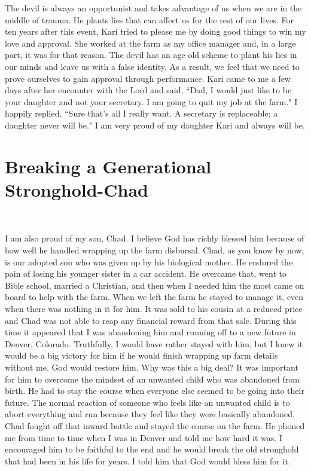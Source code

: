 \documentclass[oneside]{book}
\begin{document}
The devil is always an opportunist and takes advantage of us when we are in the middle of trauma. He plants lies that can affect us for the rest of our lives. For ten years after this event,  Kari tried to please me by doing good things to win my love and approval. She worked at the farm as my office manager and, in a large part, it was for that reason. The devil has an age old scheme to plant his lies in our minds and leave us with a false identity. As a result, we feel that we need to prove ourselves to gain approval through performance. Kari came to me a few days after her encounter with the Lord and said, ``Dad, I would just like to be your daughter and not your secretary. I am going to quit my job at the farm." I happily replied, ``Sure that's all I really want. A secretary is replaceable; a daughter never will be." I am  very proud of my daughter Kari and always will be. 


\section{Breaking a Generational Stronghold-Chad}
\

I am also proud of my son, Chad. I believe God has richly blessed him because of how well he handled wrapping up the farm disbursal. Chad, as you know by now, is our adopted son who was given up by his biological mother. He endured the pain of losing his younger sister in a car accident. He overcame that, went to Bible school, married a Christian, and then when I needed him the most came on board to help with the farm. When we left the farm he stayed to manage it, even when there was nothing in it for him. It was sold to his cousin at a reduced price and Chad was not able to reap any financial reward from that sale. During this time it appeared that I was abandoning him and running off to a new future in Denver, Colorado. Truthfully, I would have rather stayed with him, but I knew it would be a big victory for him if he would finish wrapping up farm details without me. God would restore him. Why was this a big deal? It was important for him to overcome the mindset of an unwanted child who was abandoned from birth. He had to stay the course when everyone else seemed to be going into their future. The normal reaction of someone who feels like an unwanted child is to abort everything and run because they feel like they were basically abandoned. Chad fought off that inward battle and stayed the course on the farm. He phoned me from time to time when I was in Denver and told me how hard it was. I encouraged him to be faithful to the end and he would break the old stronghold that had been in his life for years. I told him that God would bless him for it. 
\end{document}
